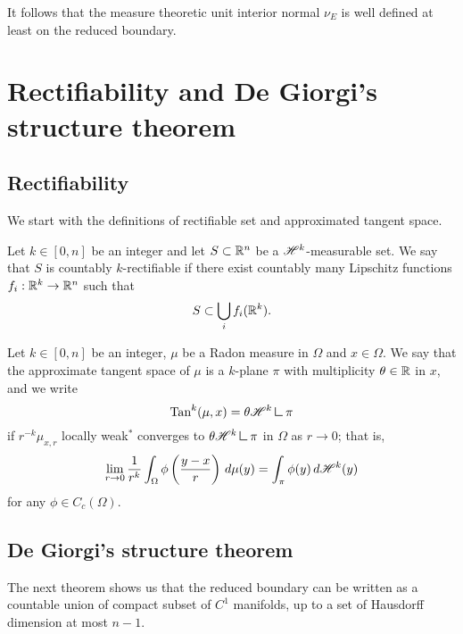 It follows that the measure theoretic unit interior normal $\nu_{E}$ is well defined at least on the reduced boundary. 


\section{Rectifiability and De Giorgi's structure theorem}

\subsection{Rectifiability}

We start with the definitions of rectifiable set and approximated tangent space.

\begin{definition}
Let $k \in [0, n]$ be an integer and let $S \subset \mathbb{R}^{n}$ be a $\mathscr{H}^{k}$-measurable set. We say that $S$ is countably $k$-rectifiable if there exist countably many Lipschitz functions $f_{i} : \mathbb{R}^{k} \to \mathbb{R}^{n}$ such that 
\begin{equation*}
S \subset \bigcup_{i} f_{i}(\mathbb{R}^{k}).
\end{equation*}
\end{definition}

\begin{definition}
Let $k \in [0, n]$ be an integer, $\mu$ be a Radon measure in $\Omega$ and $x \in \Omega$. We say that the approximate tangent space of $\mu$ is a $k$-plane $\pi$ with multiplicity $\theta \in \mathbb{R}$ in $x$, and we write 
\begin{equation*}
\Tan^{k}(\mu, x) = \theta \Haus{k} \res \pi
\end{equation*}
if $r^{-k} \mu_{x, r}$ locally weak$^*$ converges to $\theta \Haus{k} \res \pi$ in $\Omega$ as $r \to 0$; that is, 
\begin{equation*}
\lim_{r \to 0} \frac{1}{r^{k}} \int_{\Omega} \phi\left (\frac{y - x}{r}\right) \, d \mu(y) = \int_{\pi} \phi(y) \, d \mathscr{H}^{k}(y)
\end{equation*}
for any $\phi \in C_{c}(\Omega)$.
\end{definition}

\subsection{De Giorgi's structure theorem}

The next theorem shows us that the reduced boundary can be written as a countable union of compact subset of $C^{1}$ manifolds, up to a set of Hausdorff dimension at most $n-1$. 

